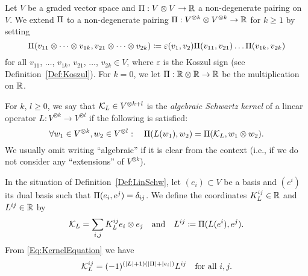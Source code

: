 \documentclass[\MainFolder/Text.tex]{subfiles}
\begin{document}
\begin{Definition}\label{Def:LinSchw}
Let $V$ be a graded vector space and $\Pi: V\otimes V \rightarrow \mathbb{R}$ a non-degenerate pairing on $V$. We extend $\Pi$ to a non-degenerate pairing $\Pi: V^{\otimes k}\otimes V^{\otimes k}\rightarrow \mathbb{R}$ for $k\ge 1$ by setting
\begin{equation*} 
\Pi(v_{11} \otimes \dotsb \otimes v_{1k}, v_{21}\otimes \dotsb \otimes v_{2k}) \coloneqq \varepsilon(v_1, v_2)\Pi(v_{11},v_{21}) \dots \Pi(v_{1k},v_{2k})
\end{equation*}
for all $v_{11}$, $\dotsc$, $v_{1k}$, $v_{21}$, $\dotsc$,  $v_{2k}\in V$, where $\varepsilon$ is the Koszul sign (see Definition~\ref{Def:Koszul}). For $k=0$, we let $\Pi: \mathbb{R}\otimes \mathbb{R} \rightarrow \mathbb{R}$ be the multiplication on $\mathbb{R}$.

For $k$, $l \ge 0$, we say that $\mathcal{K}_L\in V^{\otimes k + l}$ is the \emph{algebraic Schwartz kernel} of a linear operator $L: V^{\otimes k} \rightarrow V^{\otimes l}$ if the following is satisfied:
\begin{equation} \label{Eq:KernelEquation}
\forall w_1 \in V^{\otimes k},  w_2 \in V^{\otimes l}:\quad \Pi(L(w_1),w_2) = \Pi(\mathcal{K}_L, w_1\otimes w_2).
\end{equation}
We usually omit writing ``algebraic'' if it is clear from the context (i.e., if we do not consider any ``extensions'' of $V^{\otimes k}$). 
\end{Definition}

In the situation of Definition~\ref{Def:LinSchw}, let $(e_i)\subset V$ be a basis and $(e^i)$ its dual basis such that $\Pi(e_i,e^j)=\delta_{ij}$. We define the coordinates $K_L^{ij} \in \mathbb{R}$ and $L^{ij}\in \mathbb{R}$ by 
\[ \mathcal{K}_L = \sum_{i,j} K_L^{ij} e_i \otimes e_j\quad\text{and}\quad L^{ij} \coloneqq \Pi(L (e^i),e^j).\]
From \eqref{Eq:KernelEquation} we have
\begin{equation} \label{Eq:KernelCoordinates}
\mathcal{K}_L^{ij} = (-1)^{(|L|+1)(|\Pi|+|e_i|)} L^{ij}\quad \text{for all }i,j.
\end{equation} 
\end{document}
